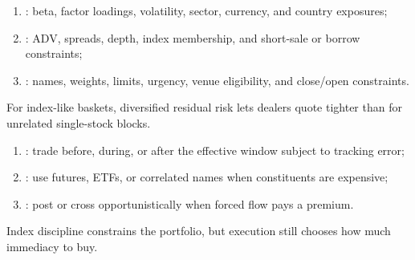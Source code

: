 \documentclass[a4paper,oneside,openany]{book}
\begin{document}
\begin{taxonomy} 
\begin{enumerate}[label=\roman*.]
\setlength{\itemsep}{0pt}
\item {}: beta, factor loadings, volatility, sector, currency, and country exposures;
\item {}: ADV, spreads, depth, index membership, and short-sale or borrow constraints;
\item {}: names, weights, limits, urgency, venue eligibility, and close/open constraints.
\end{enumerate}
For index-like baskets, diversified residual risk lets dealers quote tighter than for unrelated single-stock blocks.
\end{taxonomy}

\begin{taxonomy} 
\begin{enumerate}[label=\roman*.]
\setlength{\itemsep}{0pt}
\item {}: trade before, during, or after the effective window subject to tracking error;
\item {}: use futures, ETFs, or correlated names when constituents are expensive;
\item {}: post or cross opportunistically when forced flow pays a premium.
\end{enumerate}
Index discipline constrains the portfolio, but execution still chooses how much immediacy to buy.
\end{taxonomy}
\end{document}

